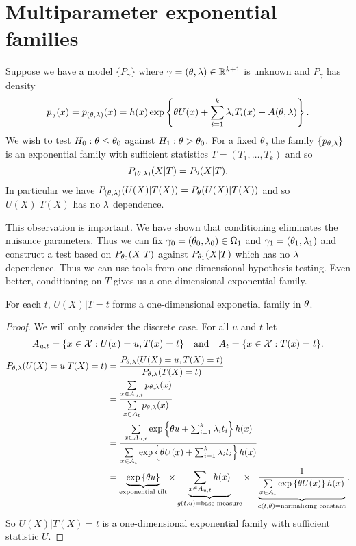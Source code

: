 \section{Multiparameter exponential families}
Suppose we have a model $\{P_{\gamma}\}$ where $\gamma = ({\theta},\lambda) \in {\mathbb R}^{k+1}$ is unknown and $P_{\gamma}$ has density
\[p_\gamma(x) = p_{({\theta},\lambda)}(x) = h(x) \exp\left\{{\theta} U(x)+\sum_{i=1}^k \lambda_i T_i(x) - A({\theta},\lambda)\right\}. \]
We wish to test $H_0 : {\theta} \le {\theta}_0$ against $H_1 : {\theta} > {\theta}_0$. For a fixed ${\theta}$, the family $\{p_{{\theta},\lambda}\}$ is an exponential family with sufficient statistics $T = (T_1,\ldots, T_k)$ and so 
\[P_{({\theta},\lambda)}(X|T) = P_{\theta}(X|T). \]
In particular we have $P_{({\theta},\lambda)}(U(X)|T(X)) = P_{\theta}(U(X)|T(X))$ and so $U(X)|T(X)$ has no $\lambda$ dependence.
\begin{remark}
    This observation is important. We have shown that conditioning eliminates the nuisance parameters. Thus we can fix $\gamma_0 =({\theta}_0,\lambda_0) \in {{\Omega}}_1$ and $\gamma_1 = ({\theta}_1,\lambda_1)$ and construct a test based on $P_{{\theta}_0}(X|T)$ against $P_{{\theta}_1}(X|T)$ which has no $\lambda$ dependence. Thus we can use tools from one-dimensional hypothesis testing. Even better, conditioning on $T$ gives us a one-dimensional exponential family.
\end{remark}
\begin{lemma}
    For each $t$, $U(X)|T=t$ forms a one-dimensional exponetial family in ${\theta}$.
\end{lemma}
\begin{proof}
    We will only consider the discrete case. For all $u$ and $t$ let
    \[A_{u,t} = \{x \in {\mathcal{X}} : U(x)=u, T(x)=t\}~~~\text{and}~~~ A_t = \{x \in {\mathcal{X}}: T(x)=t\}. \]
    \begin{align*}
        P_{{\theta},\lambda}(U(X)=u|T(X)=t) &= \frac{P_{{\theta},\lambda}(U(X)=u, T(X)=t)}{P_{{\theta},\lambda}(T(X)=t)}\\
        &=\frac{\sum\limits_{x\in A_{u,t}}p_{{\theta},\lambda}(x)}{\sum\limits_{x \in A_t}p_{{\theta},\lambda}(x)}\\
        &=\frac{\sum\limits_{x\in A_{u,t}}\exp\left\{{\theta} u + \sum_{i=1}^k \lambda_i t_i\right\}h(x)}{\sum\limits_{x \in A_t}\exp\left\{{\theta} U(x)+\sum_{i=1}^k \lambda_i t_i\right\}h(x)}\\
        &=\underbrace{\exp\left\{{\theta} u\right\}}_{\text{exponential tilt}} \times \underbrace{\sum_{x \in A_{u,t}} h(x)}_{g(t,u) = \text{base measure}} \times ~~\underbrace{\frac{1}{\sum\limits_{x \in A_t} \exp\left\{{\theta} U(x)\right\}h(x)}}_{c(t,{\theta})=\text{normalizing constant}}.
    \end{align*}
    So $U(X)|T(X)=t$ is a one-dimensional exponential family with sufficient statistic $U$.
\end{proof}
